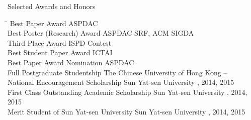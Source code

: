 
\begin{rSection}{Selected Awards and Honors}
\begin{tabbing}
\hspace{3.2in}\= \hspace{2.8in}\=\kill
    Best Paper Award                   \>ASPDAC                         \\  

    Best Poster (Research) Award      \> ASPDAC SRF, ACM SIGDA        \\

    Third Place Award                 \> ISPD Contest        \\

    Best Student Paper Award                     \>ICTAI                         \\   

    Best Paper Award Nomination                  \>ASPDAC                         \\  

    Full Postgraduate Studentship                \>The Chinese University of Hong Kong                       --    \\

    National Encouragement Scholarship      \> Sun Yat-sen University     , 2014, 2015 \\

    First Class Outstanding Academic Scholarship             \> Sun Yat-sen University     , 2014, 2015 \\

    Merit Student of Sun Yat-sen University                   \> Sun Yat-sen University     , 2014, 2015 \\
\end{tabbing}
\end{rSection}

